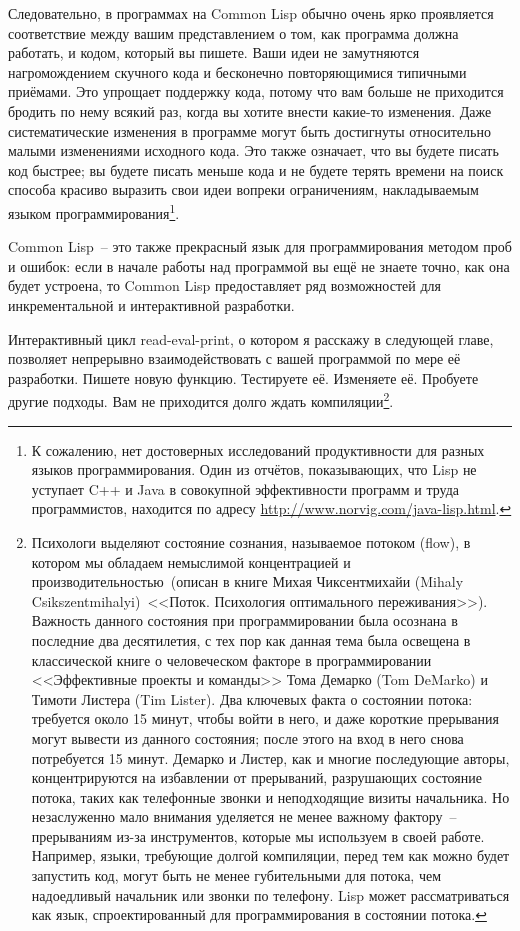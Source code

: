Следовательно, в программах на Common Lisp обычно очень ярко проявляется соответствие
между вашим представлением о том, как программа должна работать, и кодом, который вы
пишете. Ваши идеи не замутняются нагромождением скучного кода и бесконечно повторяющимися
типичными приёмами. Это упрощает поддержку кода, потому что вам больше не приходится
бродить по нему всякий раз, когда вы хотите внести какие-то изменения. Даже
систематические изменения в программе могут быть достигнуты относительно малыми
изменениями исходного кода. Это также означает, что вы будете писать код быстрее; вы
будете писать меньше кода и не будете терять времени на поиск способа красиво выразить свои идеи
вопреки ограничениям, накладываемым языком программирования\footnote{К сожалению, нет
  достоверных исследований продуктивности для разных языков программирования. Один из
  отчётов, показывающих, что Lisp не уступает C++ и Java в совокупной эффективности
  программ и труда программистов, находится по адресу
  \url{http://www.norvig.com/java-lisp.html}.}.

Common Lisp~-- это также прекрасный язык для программирования методом проб и ошибок:
если в начале работы над программой вы ещё не знаете точно, как она будет устроена, то
Common Lisp предоставляет ряд возможностей для инкрементальной и интерактивной разработки.

Интерактивный цикл read-eval-print, о котором я расскажу в следующей главе, позволяет
непрерывно взаимодействовать с вашей программой по мере её разработки. Пишете новую
функцию. Тестируете её. Изменяете её. Пробуете другие подходы. Вам не
приходится долго ждать компиляции\footnote{Психологи выделяют состояние
  сознания, называемое потоком (flow), в котором мы обладаем немыслимой концентрацией и
  производительностью~(описан в книге Михая Чиксентмихайи (Mihaly Csikszentmihalyi)~<<Поток.
  Психология оптимального переживания>>). Важность данного состояния при программировании
  была осознана в последние два десятилетия, с тех пор как данная тема была освещена в
  классической книге о человеческом факторе в программировании <<Эффективные проекты и
  команды>> Тома Демарко (Tom DeMarko) и Тимоти Листера (Tim Lister). Два ключевых факта о
  состоянии потока: требуется около 15 минут, чтобы войти в него, и даже короткие
  прерывания могут вывести из данного состояния; после этого на вход в него снова потребуется
  15 минут. Демарко и Листер, как и многие последующие авторы, концентрируются на
  избавлении от прерываний, разрушающих состояние потока, таких как телефонные звонки и
  неподходящие визиты начальника. Но незаслуженно мало внимания уделяется не менее важному фактору~--
  прерываниям из-за инструментов, которые мы используем в своей работе. Например, языки,
  требующие долгой компиляции, перед тем как можно будет запустить код, могут быть
  не менее губительными для потока, чем надоедливый начальник или звонки по телефону. Lisp
  может рассматриваться как язык, спроектированный для программирования в состоянии потока.}.


